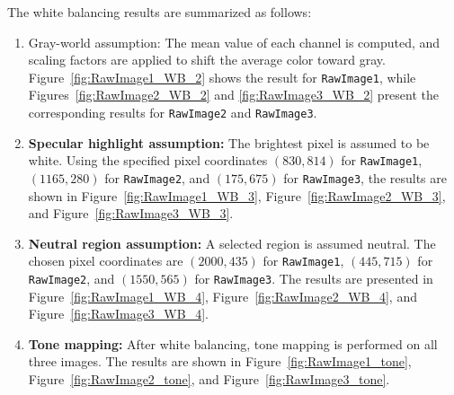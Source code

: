 \documentclass[11pt, a4]{article}
\begin{document}
\begin{enumerate}
		The white balancing results are summarized as follows:  
		\begin{enumerate}
			\item Gray-world assumption: The mean value of each channel is computed, and scaling factors are applied to shift the average color toward gray. Figure~\ref{fig:RawImage1_WB_2} shows the result for \texttt{RawImage1}, while Figures~\ref{fig:RawImage2_WB_2} and \ref{fig:RawImage3_WB_2} present the corresponding results for \texttt{RawImage2} and \texttt{RawImage3}.
			\item \textbf{Specular highlight assumption:} The brightest pixel is assumed to be white. Using the specified pixel coordinates $(830, 814)$ for \texttt{RawImage1}, $(1165, 280)$ for \texttt{RawImage2}, and $(175, 675)$ for \texttt{RawImage3}, the results are shown in Figure~\ref{fig:RawImage1_WB_3}, Figure~\ref{fig:RawImage2_WB_3}, and Figure~\ref{fig:RawImage3_WB_3}.
			\item \textbf{Neutral region assumption:} A selected region is assumed neutral. The chosen pixel coordinates are $(2000, 435)$ for \texttt{RawImage1}, $(445, 715)$ for \texttt{RawImage2}, and $(1550, 565)$ for \texttt{RawImage3}. The results are presented in Figure~\ref{fig:RawImage1_WB_4}, Figure~\ref{fig:RawImage2_WB_4}, and Figure~\ref{fig:RawImage3_WB_4}.
			\item \textbf{Tone mapping:} After white balancing, tone mapping is performed on all three images. The results are shown in Figure~\ref{fig:RawImage1_tone}, Figure~\ref{fig:RawImage2_tone}, and Figure~\ref{fig:RawImage3_tone}.
		\end{enumerate}
			\begin{figure}[h]
				\centering
\end{figure}
\end{enumerate}
\end{document}
